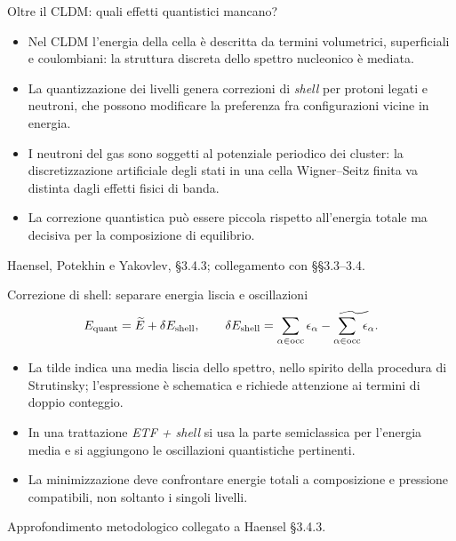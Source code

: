\begin{frame}[t]{Oltre il CLDM: quali effetti quantistici mancano?}
\small
\begin{itemize}
\item Nel CLDM l'energia della cella è descritta da termini volumetrici, superficiali e coulombiani: la struttura discreta dello spettro nucleonico è mediata.
\item La quantizzazione dei livelli genera correzioni di \emph{shell} per protoni legati e neutroni, che possono modificare la preferenza fra configurazioni vicine in energia.
\item I neutroni del gas sono soggetti al potenziale periodico dei cluster: la discretizzazione artificiale degli stati in una cella Wigner--Seitz finita va distinta dagli effetti fisici di banda.
\item La correzione quantistica può essere piccola rispetto all'energia totale ma decisiva per la composizione di equilibrio.
\end{itemize}
{\footnotesize Haensel, Potekhin e Yakovlev, §3.4.3; collegamento con §§3.3--3.4.}
\end{frame}

\begin{frame}[t]{Correzione di shell: separare energia liscia e oscillazioni}
\small
\[
E_{\rm quant}=\widetilde E+\delta E_{\rm shell},\qquad
\delta E_{\rm shell}=\sum_{\alpha\in\mathrm{occ}}\epsilon_\alpha
-\widetilde{\sum_{\alpha\in\mathrm{occ}}\epsilon_\alpha}.
\]
\begin{itemize}
\item La tilde indica una media liscia dello spettro, nello spirito della procedura di Strutinsky; l'espressione è schematica e richiede attenzione ai termini di doppio conteggio.
\item In una trattazione \emph{ETF + shell} si usa la parte semiclassica per l'energia media e si aggiungono le oscillazioni quantistiche pertinenti.
\item La minimizzazione deve confrontare energie totali a composizione e pressione compatibili, non soltanto i singoli livelli.
\end{itemize}
{\footnotesize Approfondimento metodologico collegato a Haensel §3.4.3.}
\end{frame}

